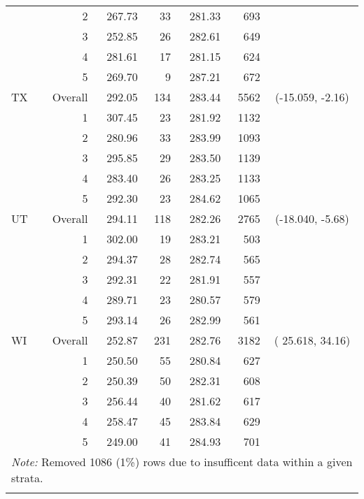 \begin{longtable}{lrrr@{\extracolsep{.25cm}}rrc}
   & 2 & 267.73 &  33 & 281.33 & 693 &  \\ 
   & 3 & 252.85 &  26 & 282.61 & 649 &  \\ 
   & 4 & 281.61 &  17 & 281.15 & 624 &  \\ 
   & 5 & 269.70 &   9 & 287.21 & 672 &  \\ 
   \hline
TX & Overall & 292.05 & 134 & 283.44 & 5562 & (-15.059,  -2.16) \\ 
   & 1 & 307.45 &  23 & 281.92 & 1132 &  \\ 
   & 2 & 280.96 &  33 & 283.99 & 1093 &  \\ 
   & 3 & 295.85 &  29 & 283.50 & 1139 &  \\ 
   & 4 & 283.40 &  26 & 283.25 & 1133 &  \\ 
   & 5 & 292.30 &  23 & 284.62 & 1065 &  \\ 
   \hline
UT & Overall & 294.11 & 118 & 282.26 & 2765 & (-18.040,  -5.68) \\ 
   & 1 & 302.00 &  19 & 283.21 & 503 &  \\ 
   & 2 & 294.37 &  28 & 282.74 & 565 &  \\ 
   & 3 & 292.31 &  22 & 281.91 & 557 &  \\ 
   & 4 & 289.71 &  23 & 280.57 & 579 &  \\ 
   & 5 & 293.14 &  26 & 282.99 & 561 &  \\ 
   \hline
WI & Overall & 252.87 & 231 & 282.76 & 3182 & ( 25.618,  34.16) \\ 
   & 1 & 250.50 &  55 & 280.84 & 627 &  \\ 
   & 2 & 250.39 &  50 & 282.31 & 608 &  \\ 
   & 3 & 256.44 &  40 & 281.62 & 617 &  \\ 
   & 4 & 258.47 &  45 & 283.84 & 629 &  \\ 
   & 5 & 249.00 &  41 & 284.93 & 701 &  \\ 
   \hline \multicolumn{7}{l}{\textit{Note:} Removed 1086 (1\%) rows due to insufficent data within a given strata.} \\\hline
\label{g8math-mlpsa-lr}
\end{longtable}
